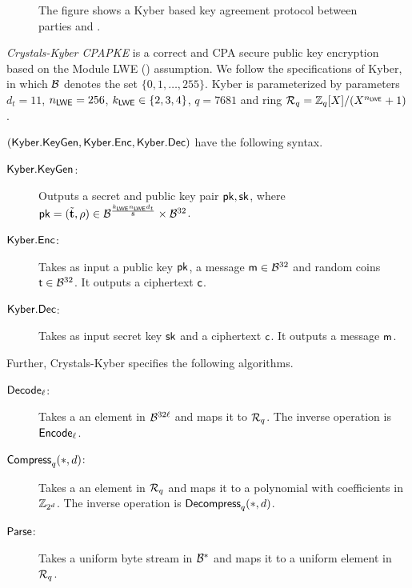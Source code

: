 \begin{figure}[h!]
\centering
{}
\label{fig:Kyber}
\caption{The figure shows a Kyber based key agreement protocol between parties \A and \B.}
\end{figure}

\begin{definition}
\emph{ Crystals-Kyber CPAPKE} is a correct and CPA secure public key encryption based on the Module LWE (\MLWE) assumption. We follow the specifications of Kyber, in which $\mathcal{B}$ denotes the  set $\{0,1,\ldots,255\}$. Kyber is parameterized by parameters $d_t=11$, $n_{\mathsf{LWE}}=256$, $k_{\mathsf{LWE}}\in\{2,3,4\}$, $q=7681$ and ring $\mathcal R_q=\mathbb Z_q[X]/(X^{n_{\mathsf{LWE}}}+1)$. 

$(\mathsf{Kyber.KeyGen},\mathsf{Kyber.Enc},\mathsf{Kyber.Dec})$ have the following syntax. 
\begin{description}
\item[$\mathsf{Kyber.KeyGen}$:] Outputs a secret and public key pair $\mathsf{pk},\mathsf{sk}$, where $\mathsf{pk}=(\tilde{{\mathbf t}},\rho)\in\mathcal{B}^{\frac{k_{\mathsf{LWE}}n_{\mathsf{LWE}} d_t}{8}}\times\mathcal{B}^{32}$.
\item[$\mathsf{Kyber.Enc}$:] Takes as input a public key $\mathsf{pk}$, a message $\mathsf{m}\in\mathcal{B}^{32}$ and random coins $\mathsf{t}\in\mathcal{B}^{32}$. It outputs a ciphertext $\mathsf{c}$.
\item[$\mathsf{Kyber.Dec}$:] Takes as input secret key $\mathsf{sk}$ and a ciphertext $\mathsf{c}$. It outputs a message $\mathsf{m}$.
\end{description}
Further, Crystals-Kyber specifies the following algorithms.
\begin{description}
\item[$\mathsf{Decode}_\ell$:] Takes a an element in $\mathcal{B}^{32\ell}$ and maps it to $\mathcal R_q$. The inverse operation is $\mathsf{Encode}_\ell$.
\item[$\mathsf{Compress}_q(*,d)$:] Takes a an element in $\mathcal R_q$ and maps it to a polynomial with coefficients in $\mathbb Z_{2^d}$. The inverse operation is $\mathsf{Decompress}_q(*,d)$.
\item[$\mathsf{Parse}$:] Takes a uniform byte stream in $\mathcal{B}^{*}$ and maps it to a uniform element in $\mathcal R_q$.
\end{description}
\end{definition}

